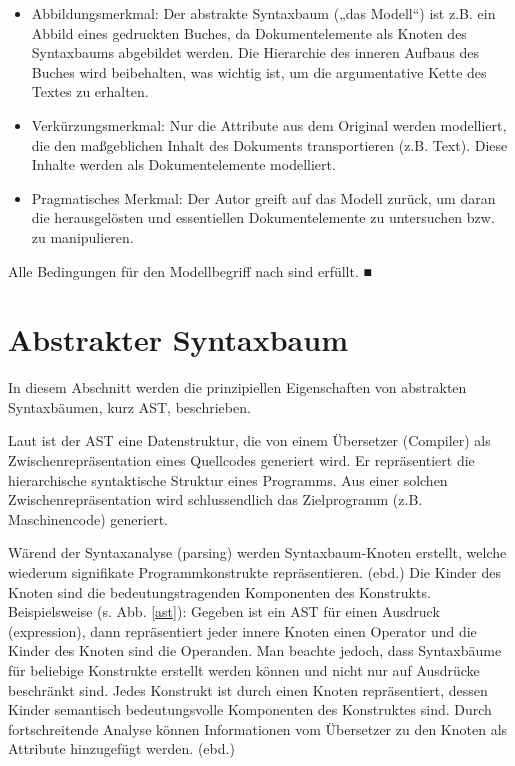  
\begin{itemize}

\item Abbildungsmerkmal: Der abstrakte Syntaxbaum („das Modell“) ist z.B. ein Abbild eines gedruckten Buches, da Dokumentelemente als Knoten des Syntaxbaums abgebildet werden. Die Hierarchie des inneren Aufbaus des Buches wird beibehalten, was wichtig ist, um die argumentative Kette des Textes zu erhalten.
\item Verkürzungsmerkmal: Nur die Attribute aus dem Original werden modelliert, die den maßgeblichen Inhalt des Dokuments transportieren (z.B. Text). Diese Inhalte werden als Dokumentelemente modelliert.
\item Pragmatisches Merkmal: Der Autor greift auf das Modell zurück, um daran die herausgelösten und essentiellen Dokumentelemente zu untersuchen bzw. zu manipulieren.
\end{itemize}
 
Alle Bedingungen für den Modellbegriff nach \citep{Stachowiak} sind erfüllt. ■

 
\section{Abstrakter Syntaxbaum}\label{ast-sec}
 
In diesem Abschnitt werden die prinzipiellen Eigenschaften von abstrakten Syntaxbäumen, kurz AST, beschrieben.

 
Laut \citep{Aho} ist der AST eine Datenstruktur, die von einem Übersetzer (Compiler) als Zwischenrepräsentation eines Quellcodes generiert wird. Er repräsentiert die hierarchische syntaktische Struktur eines Programms. Aus einer solchen Zwischenrepräsentation wird schlussendlich das Zielprogramm (z.B. Maschinencode) generiert.

 
Wärend der Syntaxanalyse (parsing) werden Syntaxbaum-Knoten erstellt, welche wiederum signifikate Programmkonstrukte repräsentieren. (ebd.) Die Kinder des Knoten sind die bedeutungstragenden Komponenten des Konstrukts. Beispielsweise (s. Abb. \ref{ast}): Gegeben ist ein AST für einen Ausdruck (expression), dann repräsentiert jeder innere Knoten einen Operator und die Kinder des Knoten sind die Operanden. Man beachte jedoch, dass Syntaxbäume für beliebige Konstrukte erstellt werden können und nicht nur auf Ausdrücke beschränkt sind. Jedes Konstrukt ist durch einen Knoten repräsentiert, dessen Kinder semantisch bedeutungsvolle Komponenten des Konstruktes sind. Durch fortschreitende Analyse können Informationen vom Übersetzer zu den Knoten als Attribute hinzugefügt werden. (ebd.)

